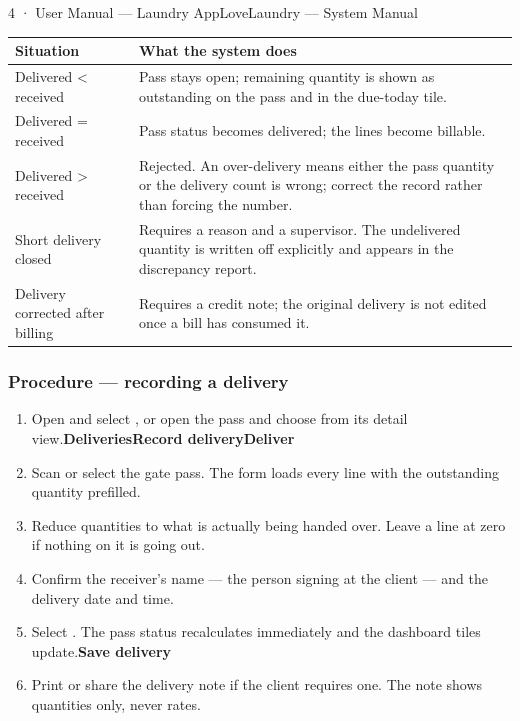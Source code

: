 \documentclass[11pt,a4paper,oneside]{book}
\begin{document}
4 · User Manual — Laundry AppLoveLaundry — System Manual

\begin{center}\small
\begin{tabularx}{\linewidth}{|X|X|}
\hline
\rowcolor{lightgrey}
\textbf{Situation} & \textbf{What the system does} \\ \hline
Delivered < received & Pass stays open; remaining quantity is shown as outstanding on the pass and in the due-today tile. \\ \hline
Delivered = received & Pass status becomes delivered; the lines become billable. \\ \hline
Delivered > received & Rejected. An over-delivery means either the pass quantity or the delivery count is wrong; correct the record rather than forcing the number. \\ \hline
Short delivery closed & Requires a reason and a supervisor. The undelivered quantity is written off explicitly and appears in the discrepancy report. \\ \hline
Delivery corrected after billing & Requires a credit note; the original delivery is not edited once a bill has consumed it. \\ \hline
\end{tabularx}
\end{center}
\subsubsection*{Procedure — recording a delivery}
\begin{enumerate}
\item Open  and select , or open the pass and choose  from its detail view.\textbf{Deliveries}\textbf{Record delivery}\textbf{Deliver}
\item Scan or select the gate pass. The form loads every line with the outstanding quantity prefilled.
\item Reduce quantities to what is actually being handed over. Leave a line at zero if nothing on it is going out.
\item Confirm the receiver's name — the person signing at the client — and the delivery date and time.
\item Select . The pass status recalculates immediately and the dashboard tiles update.\textbf{Save delivery}
\item Print or share the delivery note if the client requires one. The note shows quantities only, never rates.
\end{enumerate}
\end{document}
